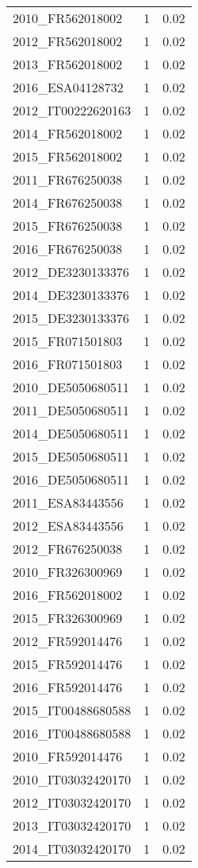\begin{table*}[htbp]
\begin{tabular}{lrr}
2010_FR562018002 & 1 & 0.02 \\
2012_FR562018002 & 1 & 0.02 \\
2013_FR562018002 & 1 & 0.02 \\
2016_ESA04128732 & 1 & 0.02 \\
2012_IT00222620163 & 1 & 0.02 \\
2014_FR562018002 & 1 & 0.02 \\
2015_FR562018002 & 1 & 0.02 \\
2011_FR676250038 & 1 & 0.02 \\
2014_FR676250038 & 1 & 0.02 \\
2015_FR676250038 & 1 & 0.02 \\
2016_FR676250038 & 1 & 0.02 \\
2012_DE3230133376 & 1 & 0.02 \\
2014_DE3230133376 & 1 & 0.02 \\
2015_DE3230133376 & 1 & 0.02 \\
2015_FR071501803 & 1 & 0.02 \\
2016_FR071501803 & 1 & 0.02 \\
2010_DE5050680511 & 1 & 0.02 \\
2011_DE5050680511 & 1 & 0.02 \\
2014_DE5050680511 & 1 & 0.02 \\
2015_DE5050680511 & 1 & 0.02 \\
2016_DE5050680511 & 1 & 0.02 \\
2011_ESA83443556 & 1 & 0.02 \\
2012_ESA83443556 & 1 & 0.02 \\
2012_FR676250038 & 1 & 0.02 \\
2010_FR326300969 & 1 & 0.02 \\
2016_FR562018002 & 1 & 0.02 \\
2015_FR326300969 & 1 & 0.02 \\
2012_FR592014476 & 1 & 0.02 \\
2015_FR592014476 & 1 & 0.02 \\
2016_FR592014476 & 1 & 0.02 \\
2015_IT00488680588 & 1 & 0.02 \\
2016_IT00488680588 & 1 & 0.02 \\
2010_FR592014476 & 1 & 0.02 \\
2010_IT03032420170 & 1 & 0.02 \\
2012_IT03032420170 & 1 & 0.02 \\
2013_IT03032420170 & 1 & 0.02 \\
2014_IT03032420170 & 1 & 0.02 \\

\end{tabular}
\end{table*}
